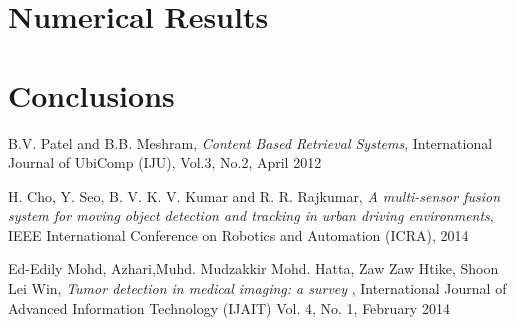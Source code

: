 \documentclass{article}
\begin{document}
{\section{Numerical Results}
 

\section{Conclusions}

  


\begin{thebibliography}{1}

	
B.V. Patel and B.B. Meshram,
\textit{Content Based Retrieval Systems},
International Journal of UbiComp (IJU), Vol.3, No.2, 
April 2012

H. Cho, Y. Seo, B. V. K. V. Kumar and R. R. Rajkumar, 
\textit{A multi-sensor fusion system for moving object detection and tracking in urban driving environments}, 
IEEE International Conference on Robotics and Automation (ICRA), 
2014

Ed-Edily Mohd,  Azhari,Muhd. Mudzakkir Mohd. Hatta, Zaw Zaw Htike,  Shoon Lei Win, 
\textit{Tumor detection in medical imaging: a survey }, 
International Journal of Advanced Information Technology (IJAIT) Vol. 4, No. 1, 
February 2014


\end{thebibliography}

}
\end{document}
